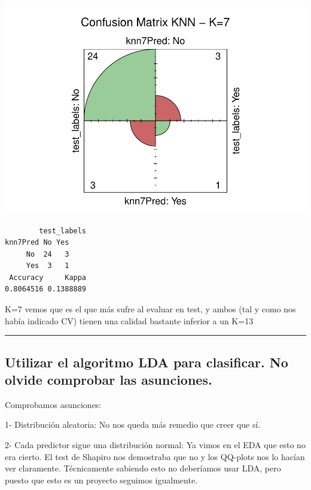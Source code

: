 \documentclass[
]{article}
\begin{document}
\begin{center}\includegraphics{Clasificacion_files/figure-latex/unnamed-chunk-16-1} \end{center}

\begin{verbatim}
        test_labels
knn7Pred No Yes
     No  24   3
     Yes  3   1
 Accuracy     Kappa 
0.8064516 0.1388889 
\end{verbatim}

K=7 vemos que es el que más sufre al evaluar en test, y ambos (tal y
como nos había indicado CV) tienen una calidad bastante inferior a un
K=13

\begin{center}\rule{0.5\linewidth}{0.5pt}\end{center}

\hypertarget{utilizar-el-algoritmo-lda-para-clasificar.-no-olvide-comprobar-las-asunciones.}{%
\subsection{Utilizar el algoritmo LDA para clasificar. No olvide
comprobar las
asunciones.}\label{utilizar-el-algoritmo-lda-para-clasificar.-no-olvide-comprobar-las-asunciones.}}

Comprobamos asunciones:

1- Distribución aleatoria: No nos queda más remedio que creer que sí.

2- Cada predictor sigue una distribución normal: Ya vimos en el EDA que
esto no era cierto. El test de Shapiro nos demostraba que no y los
QQ-plots nos lo hacían ver claramente. Técnicamente sabiendo esto no
deberíamos usar LDA, pero puesto que esto es un proyecto seguimos
igualmente.
\end{document}

